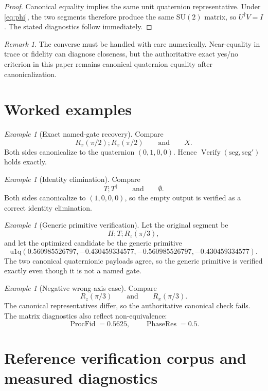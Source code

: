 \documentclass[11pt]{article}
\theoremstyle{remark}
\newtheorem{remark}[definition]{Remark}
\newtheorem{example}[definition]{Example}
\newcommand{\SU}{\mathrm{SU}}
\newcommand{\Id}{I}
\newcommand{\uoneq}{\mathrm{u1q}}
\newcommand{\Verify}{\operatorname{Verify}}
\newcommand{\ProcFid}{\operatorname{ProcFid}}
\newcommand{\PhaseRes}{\operatorname{PhaseRes}}
\begin{document}
\begin{proof}
Canonical equality implies the same unit quaternion representative. Under
\eqref{eq:phi}, the two segments therefore produce the same $\SU(2)$ matrix, so
$U^\dagger V=\Id$. The stated diagnostics follow immediately.
\end{proof}

\begin{remark}
The converse must be handled with care numerically. Near-equality in trace or
fidelity can diagnose closeness, but the authoritative exact yes/no criterion in
this paper remains canonical quaternion equality after canonicalization.
\end{remark}

\section{Worked examples}

\begin{example}[Exact named-gate recovery]
Compare
\[
R_x(\pi/2);R_x(\pi/2)
\qquad\text{and}\qquad
X.
\]
Both sides canonicalize to the quaternion $(0,1,0,0)$. Hence
$\Verify(\mathrm{seg},\mathrm{seg}')$ holds exactly.
\end{example}

\begin{example}[Identity elimination]
Compare
\[
T;T^\dagger
\qquad\text{and}\qquad
\emptyset.
\]
Both sides canonicalize to $(1,0,0,0)$, so the empty output is verified as a
correct identity elimination.
\end{example}

\begin{example}[Generic primitive verification]
Let the original segment be
\[
H;T;R_z(\pi/3),
\]
and let the optimized candidate be the generic primitive
\[
\uoneq(0.560985526797,-0.430459334577,-0.560985526797,-0.430459334577).
\]
The two canonical quaternionic payloads agree, so the generic primitive is
verified exactly even though it is not a named gate.
\end{example}

\begin{example}[Negative wrong-axis case]
Compare
\[
R_z(\pi/3)
\qquad\text{and}\qquad
R_x(\pi/3).
\]
The canonical representatives differ, so the authoritative canonical check fails.
The matrix diagnostics also reflect non-equivalence:
\[
\ProcFid=0.5625,\qquad \PhaseRes=0.5.
\]
\end{example}

\section{Reference verification corpus and measured diagnostics}
\end{document}
